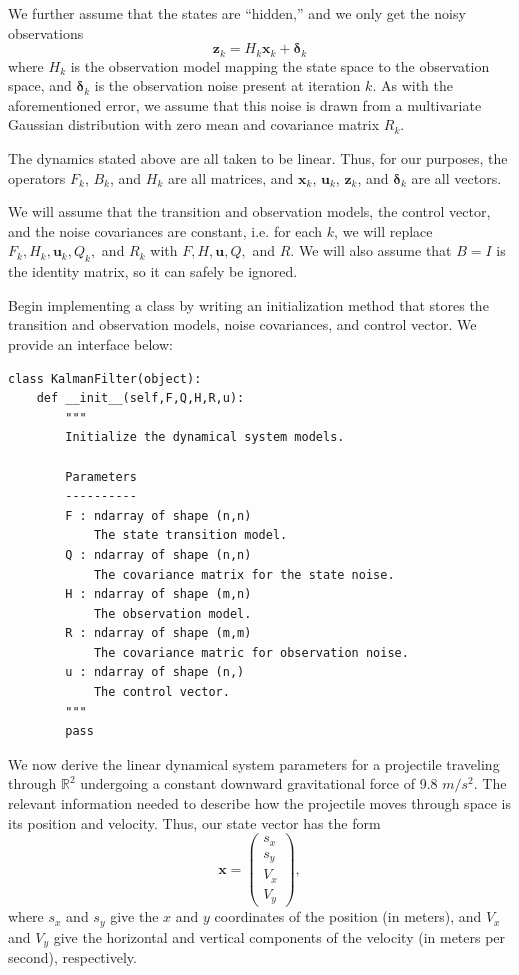 We further assume that the states are ``hidden,'' and we only get the noisy observations
\begin{equation}
\mathbf{z}_{k} = H_{k}\mathbf{x}_{k} + \boldsymbol{\delta}_{k}
\label{eq:obs}
\end{equation}
where $H_{k}$ is the observation model mapping the state space to the observation space, and $\boldsymbol{\delta}_{k}$ is the observation noise present at iteration $k$.
As with the aforementioned error, we assume that this noise is drawn from a multivariate Gaussian distribution with zero mean and covariance matrix $R_{k}$.

The dynamics stated above are all taken to be linear.
Thus, for our purposes, the operators $F_k$, $B_k$, and $H_k$ are all matrices, and $\mathbf{x}_k$, $\mathbf{u}_k$, $\mathbf{z}_k$, and $\boldsymbol{\delta}_k$ are all vectors.

We will assume that the transition and observation models, the control vector, and the noise covariances are constant, i.e. for each $k$, we will replace $F_{k}, H_k, \mathbf{u}_{k}, Q_{k},$ and $R_{k}$ with $F, H, \mathbf{u}, Q,$ and $R$.
We will also assume that $B = I$ is the identity matrix, so it can safely be ignored.

\begin{problem}
Begin implementing a  class by writing an initialization method that stores the transition and observation models, noise covariances, and control vector.
We provide an interface below:
\begin{lstlisting}
class KalmanFilter(object):
    def __init__(self,F,Q,H,R,u):
        """
        Initialize the dynamical system models.

        Parameters
        ----------
        F : ndarray of shape (n,n)
            The state transition model.
        Q : ndarray of shape (n,n)
            The covariance matrix for the state noise.
        H : ndarray of shape (m,n)
            The observation model.
        R : ndarray of shape (m,m)
            The covariance matric for observation noise.
        u : ndarray of shape (n,)
            The control vector.
        """
        pass
\end{lstlisting}
\end{problem}

We now derive the linear dynamical system parameters for a projectile traveling through $\mathbb{R}^2$ undergoing a constant downward gravitational force of 9.8 $m/s^2$.
The relevant information needed to describe how the projectile moves through space is its position and velocity.
Thus, our state vector has the form
\[
\mathbf{x} = \left( \begin{array}{c} s_{x} \\ s_{y} \\ V_{x} \\ V_{y} \end{array} \right),
\]
where $s_x$ and $s_y$ give the $x$ and $y$ coordinates of the position (in meters), and $V_x$ and $V_y$ give the horizontal and vertical components of the velocity (in meters per second), respectively.

